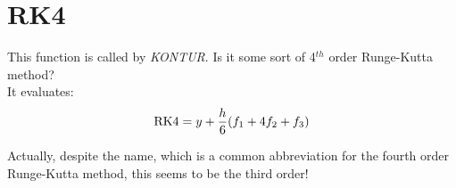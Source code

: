 \section{RK4}
\label{sect:rk4}

\noindent This function is called by {\em KONTUR}. Is it some sort of 4$^{th}$
order Runge-Kutta method?\\

\noindent It evaluates:\\

\begin{equation}
\mathrm{RK4} = y + {h \over 6} (f_1 + 4 f_2 + f_3)
\end{equation}

\noindent Actually, despite the name, which is a common abbreviation for the
fourth order Runge-Kutta method, this seems to be the third order!\\
